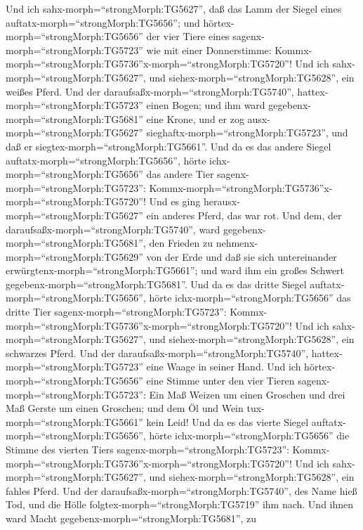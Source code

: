  Und ich sahx-morph=``strongMorph:TG5627'', daß das Lamm der
Siegel eines auftatx-morph=``strongMorph:TG5656''; und
hörtex-morph=``strongMorph:TG5656'' der vier Tiere eines
sagenx-morph=``strongMorph:TG5723'' wie mit einer Donnerstimme:
Kommx-morph=``strongMorph:TG5736''x-morph=``strongMorph:TG5720''!
 Und ich sahx-morph=``strongMorph:TG5627'', und
siehex-morph=``strongMorph:TG5628'', ein weißes Pferd. Und der
daraufsaßx-morph=``strongMorph:TG5740'',
hattex-morph=``strongMorph:TG5723'' einen Bogen; und ihm ward
gegebenx-morph=``strongMorph:TG5681'' eine Krone, und er zog
ausx-morph=``strongMorph:TG5627''
sieghaftx-morph=``strongMorph:TG5723'', und daß er
siegtex-morph=``strongMorph:TG5661''.  Und da es das andere
Siegel auftatx-morph=``strongMorph:TG5656'', hörte
ichx-morph=``strongMorph:TG5656'' das andere Tier
sagenx-morph=``strongMorph:TG5723'':
Kommx-morph=``strongMorph:TG5736''x-morph=``strongMorph:TG5720''!
 Und es ging herausx-morph=``strongMorph:TG5627'' ein
anderes Pferd, das war rot. Und dem, der
daraufsaßx-morph=``strongMorph:TG5740'', ward
gegebenx-morph=``strongMorph:TG5681'', den Frieden zu
nehmenx-morph=``strongMorph:TG5629'' von der Erde und daß sie sich
untereinander erwürgtenx-morph=``strongMorph:TG5661''; und ward ihm ein
großes Schwert gegebenx-morph=``strongMorph:TG5681''.  Und
da es das dritte Siegel auftatx-morph=``strongMorph:TG5656'', hörte
ichx-morph=``strongMorph:TG5656'' das dritte Tier
sagenx-morph=``strongMorph:TG5723'':
Kommx-morph=``strongMorph:TG5736''x-morph=``strongMorph:TG5720''! Und
ich sahx-morph=``strongMorph:TG5627'', und
siehex-morph=``strongMorph:TG5628'', ein schwarzes Pferd. Und der
daraufsaßx-morph=``strongMorph:TG5740'',
hattex-morph=``strongMorph:TG5723'' eine Waage in seiner Hand.
 Und ich hörtex-morph=``strongMorph:TG5656'' eine Stimme
unter den vier Tieren sagenx-morph=``strongMorph:TG5723'': Ein Maß
Weizen um einen Groschen und drei Maß Gerste um einen Groschen; und dem
Öl und Wein tux-morph=``strongMorph:TG5661'' kein Leid!  Und
da es das vierte Siegel auftatx-morph=``strongMorph:TG5656'', hörte
ichx-morph=``strongMorph:TG5656'' die Stimme des vierten Tiers
sagenx-morph=``strongMorph:TG5723'':
Kommx-morph=``strongMorph:TG5736''x-morph=``strongMorph:TG5720''!
 Und ich sahx-morph=``strongMorph:TG5627'', und
siehex-morph=``strongMorph:TG5628'', ein fahles Pferd. Und der
daraufsaßx-morph=``strongMorph:TG5740'', des Name hieß Tod, und die
Hölle folgtex-morph=``strongMorph:TG5719'' ihm nach. Und ihnen ward
Macht gegebenx-morph=``strongMorph:TG5681'', zu
